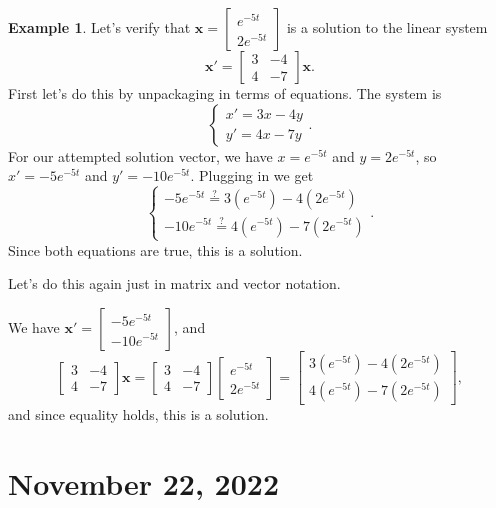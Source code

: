 \documentclass[12pt]{amsart}
\numberwithin{equation}{section}
\theoremstyle{plain} %
\newcommand{\Nov}[1]{\section{November #1, 2022}}
\theoremstyle{definition}
\newtheorem{ex}[equation]{Example}
\theoremstyle{remark}
\begin{document}
\begin{ex} Let's verify that $\mathbf{x} = \begin{bmatrix} e^{-5t} \\ 2 e^{-5t} \end{bmatrix}$ is a solution to the linear system
\[ \mathbf{x'} = \begin{bmatrix} 3 & -4 \\ 4 & -7 \end{bmatrix} \mathbf{x}.\]
First let's do this by unpackaging in terms of equations. The system is
\[ \begin{cases} x' = 3x - 4y \\ y' =4x-7y  \end{cases}.\]
For our attempted solution vector, we have $x=  e^{-5t}$ and $y=2 e^{-5t}$, so $x' = -5 e^{-5t}$ and $y'=-10 e^{-5t}$. Plugging in we get
\[ \begin{cases} -5 e^{-5t} \stackrel{?}{=} 3 (e^{-5t}) - 4 (2 e^{-5t})  \\ -10 e^{-5t} \stackrel{?}{=}  4 (e^{-5t}) - 7 (2 e^{-5t}) \end{cases}.\]
Since both equations are true, this is a solution.

Let's do this again just in matrix and vector notation.
 
We have $\mathbf{x'} =  \begin{bmatrix} -5 e^{-5t} \\ -10 e^{-5t} \end{bmatrix}$, and 
\[ \begin{bmatrix} 3 & -4 \\ 4 & -7 \end{bmatrix} \mathbf{x} = \begin{bmatrix} 3 & -4 \\ 4 & -7 \end{bmatrix}  \begin{bmatrix} e^{-5t} \\ 2 e^{-5t} \end{bmatrix} = \begin{bmatrix} 3 (e^{-5t}) - 4 (2 e^{-5t}) \\ 4 (e^{-5t}) - 7 (2 e^{-5t}) \end{bmatrix} ,\]
and since equality holds, this is a solution.
\end{ex}


\Nov{22}
\end{document}
